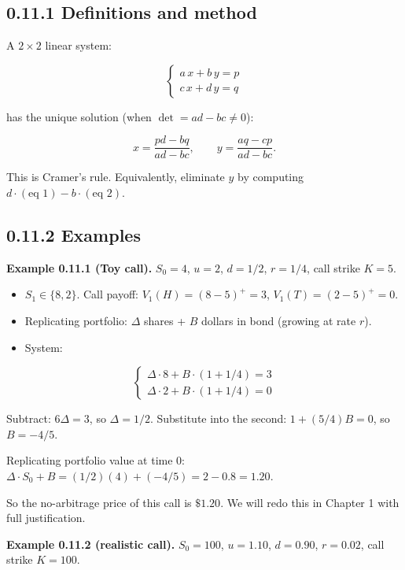 \documentclass[
  10pt,
  twoside]{book}
\providecommand{\tightlist}{%
  \setlength{\itemsep}{0pt}\setlength{\parskip}{0pt}}
\begin{document}
\subsection{0.11.1 Definitions and method}\label{definitions-and-method}

A \(2 \times 2\) linear system:

\[\begin{cases} a\,x + b\,y = p \\ c\,x + d\,y = q \end{cases}\]

has the unique solution (when \(\det = ad - bc \neq 0\)):

\[x = \frac{p d - b q}{a d - b c}, \qquad y = \frac{a q - c p}{a d - b c}.\]

This is Cramer's rule. Equivalently, eliminate \(y\) by computing
\(d \cdot (\text{eq 1}) - b \cdot (\text{eq 2})\).

\subsection{0.11.2 Examples}\label{examples-10}

\textbf{Example 0.11.1 (Toy call).} \(S_0 = 4\), \(u = 2\), \(d = 1/2\),
\(r = 1/4\), call strike \(K = 5\).

\begin{itemize}
\tightlist
\item
  \(S_1 \in \{8, 2\}\). Call payoff: \(V_1(H) = (8 - 5)^+ = 3\),
  \(V_1(T) = (2 - 5)^+ = 0\).
\item
  Replicating portfolio: \(\Delta\) shares + \(B\) dollars in bond
  (growing at rate \(r\)).
\item
  System:
\end{itemize}

\[\begin{cases} \Delta \cdot 8 + B \cdot (1 + 1/4) = 3 \\ \Delta \cdot 2 + B \cdot (1 + 1/4) = 0 \end{cases}\]

Subtract: \(6\Delta = 3\), so \(\Delta = 1/2\). Substitute into the
second: \(1 + (5/4)B = 0\), so \(B = -4/5\).

Replicating portfolio value at time 0:
\(\Delta \cdot S_0 + B = (1/2)(4) + (-4/5) = 2 - 0.8 = 1.20\).

So the no-arbitrage price of this call is \(\$1.20\). We will redo this
in Chapter 1 with full justification.

\textbf{Example 0.11.2 (realistic call).} \(S_0 = 100\), \(u = 1.10\),
\(d = 0.90\), \(r = 0.02\), call strike \(K = 100\).
\end{document}
